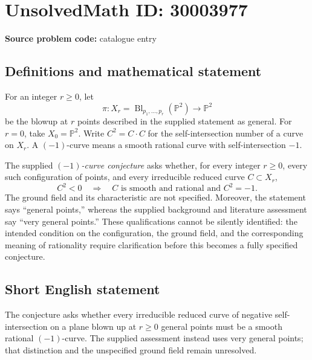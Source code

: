 \documentclass[11pt]{article}
\newcommand{\PP}{\mathbb{P}}
\begin{document}
\section*{UnsolvedMath ID: 30003977}
\textbf{Source problem code:} catalogue entry
\subsection{Definitions and mathematical statement}
For an integer \(r\geq 0\), let
\[
\pi\colon X_r=\operatorname{Bl}_{p_1,\ldots,p_r}(\PP^2)\longrightarrow\PP^2
\]
be the blowup at \(r\) points described in the supplied statement as general. For \(r=0\), take \(X_0=\PP^2\). Write \(C^2=C\cdot C\) for the self-intersection number of a curve on \(X_r\). A \((-1)\)-curve means a smooth rational curve with self-intersection \(-1\).

The supplied \emph{\((-1)\)-curve conjecture} asks whether, for every integer \(r\geq0\), every such configuration of points, and every irreducible reduced curve \(C\subset X_r\),
\[
C^2<0\quad\Longrightarrow\quad C\text{ is smooth and rational and }C^2=-1.
\]
The ground field and its characteristic are not specified. Moreover, the statement says ``general points,'' whereas the supplied background and literature assessment say ``very general points.'' These qualifications cannot be silently identified: the intended condition on the configuration, the ground field, and the corresponding meaning of rationality require clarification before this becomes a fully specified conjecture.
\subsection{Short English statement}
The conjecture asks whether every irreducible reduced curve of negative self-intersection on a plane blown up at \(r\geq0\) general points must be a smooth rational \((-1)\)-curve. The supplied assessment instead uses very general points; that distinction and the unspecified ground field remain unresolved.
\end{document}
